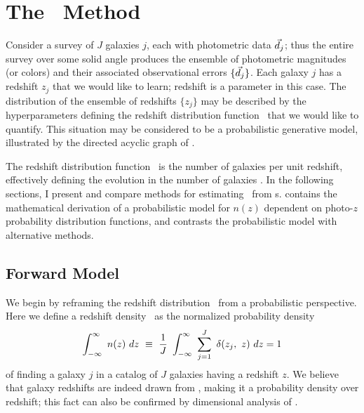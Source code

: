 \section{The \Chippr\ Method}


Consider a survey of $J$ galaxies $j$, each with photometric data $\vec{d}_{j}$; thus the entire survey over some solid angle produces the ensemble of photometric magnitudes (or colors) and their associated observational errors $\{\vec{d}_{j}\}$.  
Each galaxy $j$ has a redshift $z_{j}$ that we would like to learn; redshift is a parameter in this case.  
The distribution of the ensemble of redshifts $\{z_{j}\}$ may be described by the hyperparameters defining the redshift distribution function \nz\ that we would like to quantify.  
This situation may be considered to be a probabilistic generative model, illustrated by the directed acyclic graph of .  

The redshift distribution function \nz\ is the number of galaxies per unit redshift, effectively defining the evolution in the number of galaxies \citep{Menard2013}.  
In the following sections, I present and compare methods for estimating \nz\ from \pzpdf s.  
 contains the mathematical derivation of a probabilistic model for $n(z)$ dependent on photo-$z$ probability distribution functions, and  contrasts the probabilistic model with alternative methods.

\subsection{Forward Model}

We begin by reframing the redshift distribution \nz\ from a probabilistic perspective.
Here we define a redshift density \nz\ as the normalized probability density
\begin{equation}
\eqlabel{eqn:nz}
\int_{-\infty}^{\infty}\ n(z)\ dz\ \equiv\ \frac{1}{J}\ \int_{-\infty}^{\infty}\ \sum_{j=1}^{J}\ \delta(z_{j},\ z)\ dz = 1
\end{equation}
of finding a galaxy $j$ in a catalog of $J$ galaxies having a redshift $z$.
We believe that galaxy redshifts are indeed drawn from \nz, making it a probability density over redshift; this fact can also be confirmed by dimensional analysis of .


